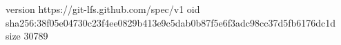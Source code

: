 version https://git-lfs.github.com/spec/v1
oid sha256:38f05e04730c23f4ee0829b413e9c5dab0b87f5e6f3adc98cc37d5fb6176dc1d
size 30789
